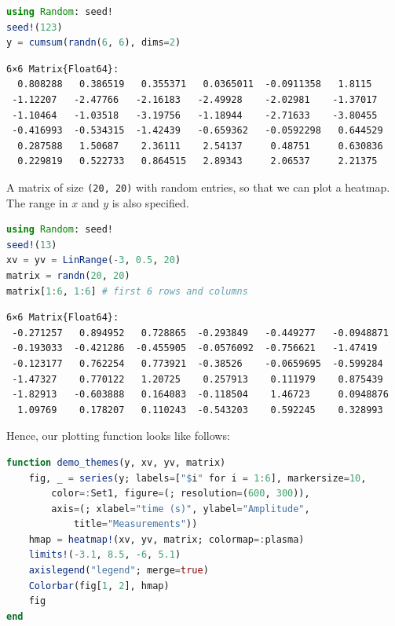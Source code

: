 \documentclass[
  notoc %
]{tufte-book}
\newcommand{\passthrough}[1]{#1}
\begin{document}
\begin{lstlisting}[language=Julia]
using Random: seed!
seed!(123)
y = cumsum(randn(6, 6), dims=2)
\end{lstlisting}

\begin{lstlisting}[language=Output]
6×6 Matrix{Float64}:
  0.808288   0.386519   0.355371   0.0365011  -0.0911358   1.8115
 -1.12207   -2.47766   -2.16183   -2.49928    -2.02981    -1.37017
 -1.10464   -1.03518   -3.19756   -1.18944    -2.71633    -3.80455
 -0.416993  -0.534315  -1.42439   -0.659362   -0.0592298   0.644529
  0.287588   1.50687    2.36111    2.54137     0.48751     0.630836
  0.229819   0.522733   0.864515   2.89343     2.06537     2.21375
\end{lstlisting}

A matrix of size \passthrough{\lstinline!(20, 20)!} with random entries,
so that we can plot a heatmap. The range in \(x\) and \(y\) is also
specified.

\begin{lstlisting}[language=Julia]
using Random: seed!
seed!(13)
xv = yv = LinRange(-3, 0.5, 20)
matrix = randn(20, 20)
matrix[1:6, 1:6] # first 6 rows and columns
\end{lstlisting}

\begin{lstlisting}[language=Output]
6×6 Matrix{Float64}:
 -0.271257   0.894952   0.728865  -0.293849   -0.449277   -0.0948871
 -0.193033  -0.421286  -0.455905  -0.0576092  -0.756621   -1.47419
 -0.123177   0.762254   0.773921  -0.38526    -0.0659695  -0.599284
 -1.47327    0.770122   1.20725    0.257913    0.111979    0.875439
 -1.82913   -0.603888   0.164083  -0.118504    1.46723     0.0948876
  1.09769    0.178207   0.110243  -0.543203    0.592245    0.328993
\end{lstlisting}

Hence, our plotting function looks like follows:

\begin{lstlisting}[language=Julia]
function demo_themes(y, xv, yv, matrix)
    fig, _ = series(y; labels=["$i" for i = 1:6], markersize=10,
        color=:Set1, figure=(; resolution=(600, 300)),
        axis=(; xlabel="time (s)", ylabel="Amplitude",
            title="Measurements"))
    hmap = heatmap!(xv, yv, matrix; colormap=:plasma)
    limits!(-3.1, 8.5, -6, 5.1)
    axislegend("legend"; merge=true)
    Colorbar(fig[1, 2], hmap)
    fig
end
\end{lstlisting}
\end{document}
